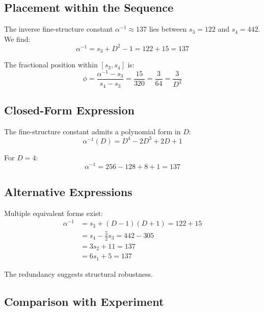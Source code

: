 \documentclass[11pt,a4paper]{article}
\begin{document}
\subsection{Placement within the Sequence}

The inverse fine-structure constant $\alpha^{-1} \approx 137$ lies between 
$s_3 = 122$ and $s_4 = 442$. We find:
\begin{equation}
\alpha^{-1} = s_3 + D^2 - 1 = 122 + 15 = 137
\label{eq:alpha_placement}
\end{equation}

The fractional position within $[s_3, s_4]$ is:
\begin{equation}
\phi = \frac{\alpha^{-1} - s_3}{s_4 - s_3} = \frac{15}{320} = \frac{3}{64} = \frac{3}{D^3}
\label{eq:phi}
\end{equation}

\subsection{Closed-Form Expression}

The fine-structure constant admits a polynomial form in $D$:
\begin{equation}
\boxed{\alpha^{-1}(D) = D^4 - 2D^3 + 2D + 1}
\label{eq:alpha_D}
\end{equation}

For $D = 4$:
\begin{equation}
\alpha^{-1} = 256 - 128 + 8 + 1 = 137
\end{equation}

\subsection{Alternative Expressions}

Multiple equivalent forms exist:
\begin{align}
\alpha^{-1} &= s_3 + (D-1)(D+1) = 122 + 15 \\
&= s_4 - \tfrac{5}{2}s_3 = 442 - 305 \\
&= 3s_2 + 11 = 137 \\
&= 6s_1 + 5 = 137
\end{align}

The redundancy suggests structural robustness.

\subsection{Comparison with Experiment}
\end{document}
